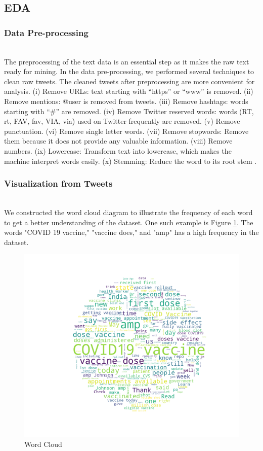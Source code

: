 \documentclass[sigplan,screen]{acmart}
\begin{document}
\subsection{EDA}
\subsubsection{Data Pre-processing}
~\\
The preprocessing of the text data is an essential step as it makes the raw text ready for mining. In the data pre-processing, we performed several techniques to clean raw tweets. The cleaned tweets after preprocessing are more convenient for analysis. (i) Remove URLs: text starting with “https” or “www” is removed. (ii) Remove mentions: @user is removed from tweets. (iii) Remove hashtags: words starting with “\#” are removed. (iv) Remove Twitter reserved words: words (RT, rt, FAV, fav, VIA, via) used on Twitter frequently are removed. (v) Remove punctuation. (vi) Remove single letter words. (vii) Remove stopwords: Remove them because it does not provide any valuable information{\cite{datapre}}.  (viii) Remove numbers.  (ix) Lowercase: Transform text into lowercase, which makes the machine interpret words easily{\cite{datapre}}. (x) Stemming: Reduce the word to its root stem {\cite{stemming}}.

\subsubsection{Visualization from Tweets}
~\\
We constructed the word cloud diagram to illustrate the frequency of each word to get a better understanding of the dataset. One such example is Figure \ref{fig:wordcloud}. The words "COVID 19 vaccine," "vaccine does," and "amp" has a high frequency in the dataset.
\begin{figure}[h]
  \centering
  \includegraphics[width=0.65\linewidth]{resource/xinran/Word_Cloud.png}
  \caption{Word Cloud}
  \label{fig:wordcloud}
\end{figure}
\end{document}
